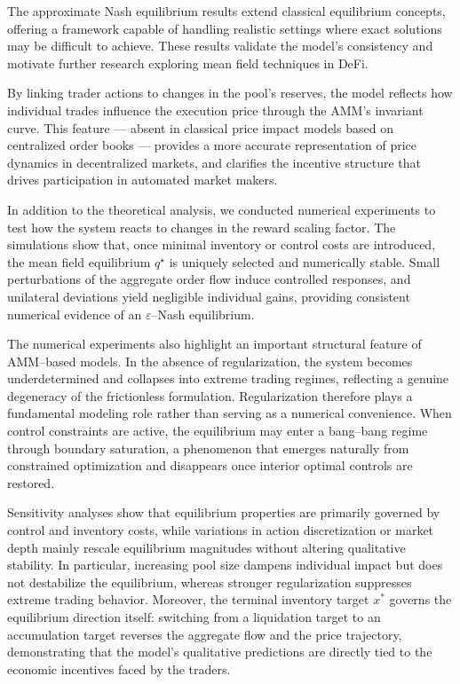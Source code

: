 \documentclass[11pt]{article}
\theoremstyle{definition}
\begin{document}
The approximate Nash equilibrium results extend classical equilibrium concepts, offering a framework capable of handling realistic settings where exact solutions may be difficult to achieve. These results validate the model's consistency and motivate further research exploring mean field techniques in DeFi.

By linking trader actions to changes in the pool's reserves, the model reflects how individual trades influence the execution price through the AMM's invariant curve. This feature — absent in classical price impact models based on centralized order books — provides a more accurate representation of price dynamics in decentralized markets, and clarifies the incentive structure that drives participation in automated market makers.

In addition to the theoretical analysis, we conducted numerical experiments to test how the system reacts to changes in the reward scaling factor. The simulations show that, once minimal inventory or control costs are introduced, the mean field equilibrium $q^\star$ is uniquely selected and numerically stable. Small perturbations of the aggregate order flow induce controlled responses, and unilateral deviations yield negligible individual gains, providing consistent numerical evidence of an $\varepsilon$--Nash equilibrium.

The numerical experiments also highlight an important structural feature of AMM--based models. In the absence of regularization, the system becomes underdetermined and collapses into extreme trading regimes, reflecting a genuine degeneracy of the frictionless formulation. Regularization therefore plays a fundamental modeling role rather than serving as a numerical convenience. When control constraints are active, the equilibrium may enter a bang--bang regime through boundary saturation, a phenomenon that emerges naturally from constrained optimization and disappears once interior optimal controls are restored.

Sensitivity analyses show that equilibrium properties are primarily governed by control and inventory costs, while variations in action discretization or market depth mainly rescale equilibrium magnitudes without altering qualitative stability. In particular, increasing pool size dampens individual impact but does not destabilize the equilibrium, whereas stronger regularization suppresses extreme trading behavior. Moreover, the terminal inventory target $x^*$ governs the equilibrium direction itself: switching from a liquidation target to an accumulation target reverses the aggregate flow and the price trajectory, demonstrating that the model's qualitative predictions are directly tied to the economic incentives faced by the traders.
\end{document}
